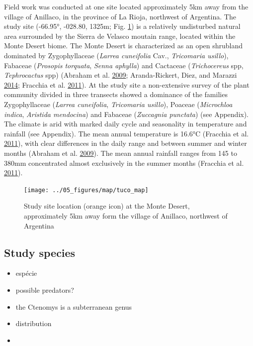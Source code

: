 \documentclass[msc,numbers,hidelinks]{coppe}
\providecommand{\tightlist}{%
  \setlength{\itemsep}{0pt}\setlength{\parskip}{0pt}}
\begin{document}
  Field work was conducted at one site located approximately 5km away from the village of Anillaco, in the province of La Rioja, northwest of Argentina. The study site (-66.95°, -028.80, 1325m; Fig. \ref{fig:methods-map}) is a relatively undisturbed natural area surrounded by the Sierra de Velasco moutain range, located within the Monte Desert biome. The Monte Desert is characterized as an open shrubland dominated by Zygophyllaceae (\emph{Larrea cuneifolia} Cav., \emph{Tricomaria usillo}), Fabaceae (\emph{Prosopis torquata}, \emph{Senna aphylla}) and Cactaceae (\emph{Trichocereus} spp, \emph{Tephrocactus} spp) (Abraham et al. \protect\hyperlink{ref-abrahamOverviewGeographyMonte2009}{2009}; Aranda-Rickert, Diez, and Marazzi \protect\hyperlink{ref-aranda-rickertExtrafloralNectarFuels2014}{2014}; Fracchia et al. \protect\hyperlink{ref-fracchiaDispersalArbuscularMycorrhizal2011}{2011}). At the study site a non-extensive survey of the plant community divided in three transects showed a dominance of the families Zygophyllaceae (\emph{Larrea cuneifolia}, \emph{Tricomaria usillo}), Poaceae (\emph{Microchloa indica}, \emph{Aristida mendocina}) and Fabaceae (\emph{Zuccagnia punctata}) (see Appendix). The climate is arid with marked daily cycle and seasonality in temperature and rainfall (see Appendix). The mean annual temperature is 16.6°C (Fracchia et al. \protect\hyperlink{ref-fracchiaDispersalArbuscularMycorrhizal2011}{2011}), with clear differences in the daily range and between summer and winter months (Abraham et al. \protect\hyperlink{ref-abrahamOverviewGeographyMonte2009}{2009}). The mean annual rainfall ranges from 145 to 380mm concentrated almost exclusively in the summer months (Fracchia et al. \protect\hyperlink{ref-fracchiaDispersalArbuscularMycorrhizal2011}{2011}).
  \begin{figure}
  \texttt{[image: ../05\_figures/map/tuco\_map]} \caption{Study site location (orange icon) at the Monte Desert, approximately 5km away form the village of Anillaco, northwest of Argentina}\label{fig:methods-map}
  \end{figure}
  \hypertarget{study-species}{%
  \subsection{Study species}\label{study-species}}
  \begin{itemize}
  \tightlist
  \item
    espécie
  \item
    possible predators?
  \item
    the Ctenomys is a subterranean genus
  \item
    distribution
  \item
  \end{itemize}
\end{document}
